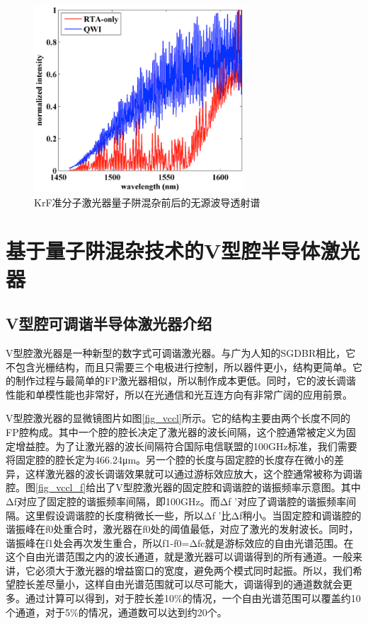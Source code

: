 \documentclass{ZJUthesis}
\begin{document}
\begin{figure}[!t]
    \centering
    \includegraphics[width=0.7\textwidth]{./Pictures/fp_loss.eps}
    \caption{KrF准分子激光器量子阱混杂前后的无源波导透射谱}
    \label{fig_fp_loss}
\end{figure}

\chapter{基于量子阱混杂技术的V型腔半导体激光器}

\section{V型腔可调谐半导体激光器介绍}

V型腔激光器是一种新型的数字式可调谐激光器。与广为人知的SGDBR相比，它不包含光栅结构，而且只需要三个电极进行控制，所以器件更小，结构更简单。它的制作过程与最简单的FP激光器相似，所以制作成本更低。同时，它的波长调谐性能和单模性能也非常好，所以在光通信和光互连方向有非常广阔的应用前景。

V型腔激光器的显微镜图片如图\ref{fig_vccl}所示。它的结构主要由两个长度不同的FP腔构成。其中一个腔的腔长决定了激光器的波长间隔，这个腔通常被定义为固定增益腔。为了让激光器的波长间隔符合国际电信联盟的100GHz标准，我们需要将固定腔的腔长定为466.24μm。另一个腔的长度与固定腔的长度存在微小的差异，这样激光器的波长调谐效果就可以通过游标效应放大，这个腔通常被称为调谐腔。图\ref{fig_vccl_f}给出了V型腔激光器的固定腔和调谐腔的谐振频率示意图。其中Δf对应了固定腔的谐振频率间隔，即100GHz。而Δf ’对应了调谐腔的谐振频率间隔。这里假设调谐腔的长度稍微长一些，所以Δf ’比Δf稍小。当固定腔和调谐腔的谐振峰在f0处重合时，激光器在f0处的阈值最低，对应了激光的发射波长。同时，谐振峰在f1处会再次发生重合，所以f1-f0=Δfc就是游标效应的自由光谱范围。在这个自由光谱范围之内的波长通道，就是激光器可以调谐得到的所有通道。一般来讲，它必须大于激光器的增益窗口的宽度，避免两个模式同时起振。所以，我们希望腔长差尽量小，这样自由光谱范围就可以尽可能大，调谐得到的通道数就会更多。通过计算可以得到，对于腔长差10\%的情况，一个自由光谱范围可以覆盖约10个通道，对于5\%的情况，通道数可以达到约20个。
\end{document}
